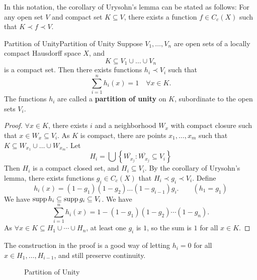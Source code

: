 \documentclass[../main.tex]{subfiles}
\begin{document}
In this notation, the corollary of Urysohn's lemma can be stated as follows: For any open set $V$ and compact set $K\subseteq V$, there exists a function $f\in C_c(X)$ such that $K\prec f\prec V$.

\begin{theorem}{Partition of Unity}{Partition of Unity}
	Suppose $V_1, \ldots ,V_n$ are open sets of a locally compact Hausdorff space $X$, and
	\begin{equation*}
	K \subseteq V_1 \cup \ldots \cup V_n
	\end{equation*}
	is a compact set. Then there exists functions $h_i\prec V_i$ such that
	\begin{equation*}
		\sum_{i=1}^n h_i(x) = 1 \quad \forall x\in K.
	\end{equation*}
	The functions $h_i$ are called a \textbf{partition of unity} on $K$, subordinate to the open sets $V_i$.
\end{theorem}
\begin{proof}
	$\forall x\in K$, there exists $i$ and a neighborhood $W_x$ with compact closure such that $x\in W_x \subseteq V_i$. As $K$ is compact, there are points $x_1, \ldots ,x_m$ such that $K \subseteq W_{x_1} \cup \ldots \cup W_{x_m}$. Let
	\begin{equation*}
	H_i = \bigcup \left\{ \overline{W_{x_j}}: \overline{W_{x_j}} \subseteq V_i \right\}
	\end{equation*}
	Then $H_i$ is a compact closed set, and $H_i \subseteq V_i$. By the corollary of Urysohn's lemma, there exists functions $g_i\in C_c(X)$ that $H_i \prec g_i\prec V_i$. Define
	\begin{equation*}
		h_i(x) = (1-g_1)(1-g_2) \ldots (1-g_{i-1}) g_i.\qquad (h_1 = g_1)
	\end{equation*}
	We have $\operatorname{supp} h_i \subseteq \operatorname{supp} g_i \subseteq V_i$. We have
	\begin{equation*}
		\sum_{i=1}^{n} h_i(x) = 1 - (1-g_1)(1-g_2) \cdots (1-g_n).
	\end{equation*}
	As $\forall x\in K \subseteq H_1\cup \cdots \cup H_n$, at least one $g_i$ is $1$, so the sum is $1$ for all $x\in K$. 
\end{proof}

\begin{remark}
The construction in the proof is a good way of letting $h_i=0$ for all $x\in H_1, \ldots ,H_{i-1}$, and still preserve continuity.
\end{remark}

\begin{figure}[ht]
    \centering
    \caption{Partition of Unity}
    \label{fig:partition-of-unity}
\end{figure}
\end{document}
